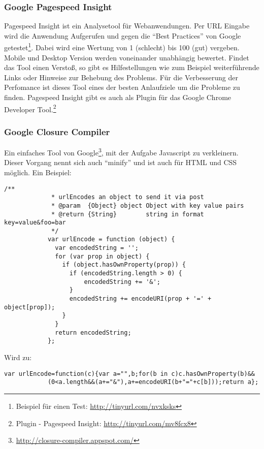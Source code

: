 		\subsubsection{Google Pagespeed Insight} %
		\label{ssub:google_pagespeed_insight}
			Pagespeed Insight ist ein Analysetool für Webanwendungen. Per URL Eingabe wird die Anwendung Aufgerufen und gegen die "`Best Practices"' von Google getestet\footnote{Beispiel für einen Test: \url{http://tinyurl.com/nvxksks}}. Dabei wird eine Wertung von 1 (schlecht) bis 100 (gut) vergeben. Mobile und Desktop Version werden voneinander unabhängig bewertet. Findet das Tool einen Verstoß, so gibt es Hilfestellungen wie zum Beispiel weiterführende Links oder Hinweise zur Behebung des Problems. Für die Verbesserung der Perfomance ist dieses Tool eines der besten Anlaufziele um die Probleme zu finden. Pagespeed Insight gibt es auch als Plugin für das Google Chrome Developer Tool.\footnote{Plugin - Pagespeed Insight: \url{http://tinyurl.com/mv8fcx8}}
		

		\subsubsection{Google Closure Compiler} %
		\label{ssub:closure_compiler}
			Ein einfaches Tool von Google\footnote{\url{http://closure-compiler.appspot.com/}}, mit der Aufgabe Javascript zu verkleinern. Dieser Vorgang nennt sich auch "`minify"' und ist auch für HTML und CSS möglich. Ein Beispiel:

			\begin{lstlisting}[captionpos=t, caption=Input, label=lst:minifyInput]
			/**
			 * urlEncodes an object to send it via post
			 * @param  {Object} object Object with key value pairs
			 * @return {String}        string in format key=value&foo=bar
			 */
			var urlEncode = function (object) {
			  var encodedString = '';
			  for (var prop in object) {
			    if (object.hasOwnProperty(prop)) {
			      if (encodedString.length > 0) {
			          encodedString += '&';
			      }
			      encodedString += encodeURI(prop + '=' + object[prop]);
			    }
			  }
			  return encodedString;
			};
			\end{lstlisting}

			Wird zu:

			\begin{lstlisting}[captionpos=t, caption=Output, label=lst:minifyOutput, breaklines=false]
			var urlEncode=function(c){var a="",b;for(b in c)c.hasOwnProperty(b)&&
			(0<a.length&&(a+="&"),a+=encodeURI(b+"="+c[b]));return a};
			\end{lstlisting}

